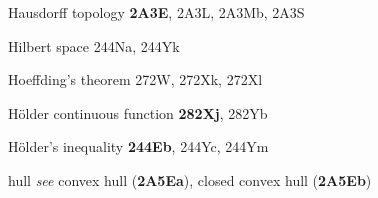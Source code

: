 Hausdorff topology {\bf 2A3E}, 2A3L, 2A3Mb, 2A3S















































Hilbert space 244Na, 244Yk
















Hoeffding's theorem 272W, 272Xk, 272Xl


H\"older continuous function {\bf 282Xj}, 282Yb


H\"older's inequality {\bf 244Eb}, 244Yc, 244Ym
























hull {\it see} convex hull ({\bf 2A5Ea}),
closed convex hull ({\bf 2A5Eb})

















